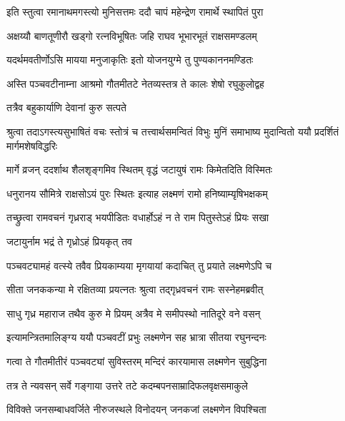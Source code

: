 \twolineshloka
{इति स्तुत्वा रमानाथमगस्त्यो मुनिसत्तमः}
{ददौ चापं महेन्द्रेण रामार्थे स्थापितं पुरा} %

\twolineshloka
{अक्षय्यौ बाणतूणीरौ खड्गो रत्नविभूषितः}
{जहि राघव भूभारभूतं राक्षसमण्डलम्} %

\twolineshloka
{यदर्थमवतीर्णोऽसि मायया मनुजाकृतिः}
{इतो योजनयुग्मे तु पुण्यकाननमण्डितः} %

\twolineshloka
{अस्ति पञ्चवटीनाम्ना आश्रमो गौतमीतटे}
{नेतव्यस्तत्र ते कालः शेषो रघुकुलोद्वह} %

\onelineshloka
{तत्रैव बहुकार्याणि देवानां कुरु सत्पते} %


\fourlineindentedshloka
{श्रुत्वा तदाऽगस्त्यसुभाषितं वचः}
{स्तोत्रं च तत्त्वार्थसमन्वितं विभुः}
{मुनिं समाभाष्य मुदान्वितो ययौ}
{प्रदर्शितं मार्गमशेषविद्धरिः} %






\twolineshloka
{मार्गे व्रजन् ददर्शाथ शैलशृङ्गमिव स्थितम्}
{वृद्धं जटायुषं रामः किमेतदिति विस्मितः} %

\twolineshloka
{धनुरानय सौमित्रे राक्षसोऽयं पुरः स्थितः}
{इत्याह लक्ष्मणं रामो हनिष्याम्यृषिभक्षकम्} %

\twolineshloka
{तच्छ्रुत्वा रामवचनं गृध्रराड् भयपीडितः}
{वधार्होऽहं न ते राम पितुस्तेऽहं प्रियः सखा} %

\onelineshloka
{जटायुर्नाम भद्रं ते गृध्रोऽहं प्रियकृत् तव} %


\twolineshloka
{पञ्चवट्यामहं वत्स्ये तवैव प्रियकाम्यया}
{मृगयायां कदाचित् तु प्रयाते लक्ष्मणेऽपि च} %

\twolineshloka
{सीता जनककन्या मे रक्षितव्या प्रयत्नतः}
{श्रुत्वा तद्गृध्रवचनं रामः सस्नेहमब्रवीत्} %

\twolineshloka
{साधु गृध्र महाराज तथैव कुरु मे प्रियम्}
{अत्रैव मे समीपस्थो नातिदूरे वने वसन्} %

\twolineshloka
{इत्यामन्त्रितमालिङ्ग्य ययौ पञ्चवटीं प्रभुः}
{लक्ष्मणेन सह भ्रात्रा सीतया रघुनन्दनः} %

\twolineshloka
{गत्वा ते गौतमीतीरं पञ्चवट्यां सुविस्तरम्}
{मन्दिरं कारयामास लक्ष्मणेन सुबुद्धिना} %

\twolineshloka
{तत्र ते न्यवसन् सर्वे गङ्गाया उत्तरे तटे}
{कदम्बपनसाम्रादिफलवृक्षसमाकुले} %

\twolineshloka
{विविक्ते जनसम्बाधवर्जिते नीरुजस्थले}
{विनोदयन् जनकजां लक्ष्मणेन विपश्चिता} %

